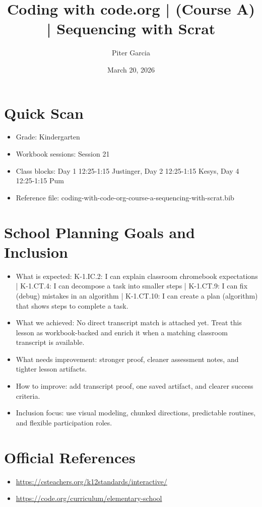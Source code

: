 \documentclass[11pt]{article}
\title{Coding with code.org | (Course A) | Sequencing with Scrat}
\author{Piter Garcia}
\date{March 20, 2026}
\begin{document}
    \maketitle
    \section*{Quick Scan}
    \begin{itemize}[leftmargin=*]
    \item Grade: Kindergarten
    \item Workbook sessions: Session 21
    \item Class blocks: Day 1 12:25-1:15 Justinger, Day 2 12:25-1:15 Kesys, Day 4 12:25-1:15 Pum
    \item Reference file: coding-with-code-org-course-a-sequencing-with-scrat.bib
    \end{itemize}
    \section*{School Planning Goals and Inclusion}
    \begin{itemize}[leftmargin=*]
    \item What is expected: K-1.IC.2: I can explain classroom chromebook expectations | K-1.CT.4: I can decompose a task into smaller steps | K-1.CT.9: I can fix (debug) mistakes in an algorithm | K-1.CT.10: I can create a plan (algorithm) that shows steps to complete a task.
    \item What we achieved: No direct transcript match is attached yet. Treat this lesson as workbook-backed and enrich it when a matching classroom transcript is available.
    \item What needs improvement: stronger proof, cleaner assessment notes, and tighter lesson artifacts.
    \item How to improve: add transcript proof, one saved artifact, and clearer success criteria.
    \item Inclusion focus: use visual modeling, chunked directions, predictable routines, and flexible participation roles.
    \end{itemize}
    \section*{Official References}
    \begin{itemize}[leftmargin=*]
    \item \url{https://csteachers.org/k12standards/interactive/}
\item \url{https://code.org/curriculum/elementary-school}

    \end{itemize}
    
\end{document}
